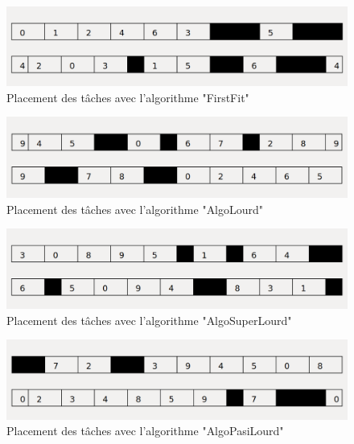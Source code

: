 \documentclass[11pt]{article}
\begin{document}
\begin{figure}[!ht]
    \center
    \includegraphics[scale = 0.35]{FirstFit}
    \caption{Placement des tâches avec l'algorithme "FirstFit"}
\end{figure} 
\begin{figure}[!ht]
    \center
    \includegraphics[scale = 0.35]{AlgoLourd}
    \caption{Placement des tâches avec l'algorithme "AlgoLourd"}
\end{figure}
\newpage
\begin{figure}[!ht]
    \center
    \includegraphics[scale = 0.35]{AlgoSuperLourd}
    \caption{Placement des tâches avec l'algorithme "AlgoSuperLourd"}
\end{figure}
\begin{figure}[!ht]
    \center
    \includegraphics[scale = 0.35]{AlgoPasiLourd}
    \caption{Placement des tâches avec l'algorithme "AlgoPasiLourd"}
\end{figure}
\end{document}
